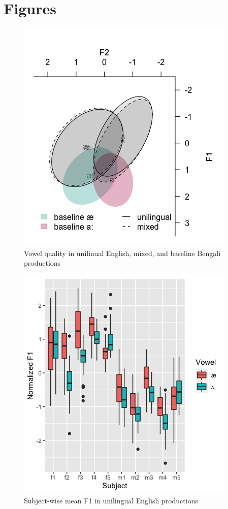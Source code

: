 \documentclass[12 pt]{article}
\begin{document}
\newpage
\section*{Figures}

\begin{figure}[h] %
	\includegraphics[scale=1]{vowels_e_b_final}
	\caption{Vowel quality in unilinual English, mixed, and baseline Bengali productions}
	\label{vowels_e_b}
\end{figure}

\newpage

\begin{figure}[h] %
	
	\includegraphics[scale=1]{vowel_by_subject_ggplot}
	\caption{Subject-wise mean F1 in unilingual English productions}
	\label{boxplot_F1}
\end{figure}
\end{document}
